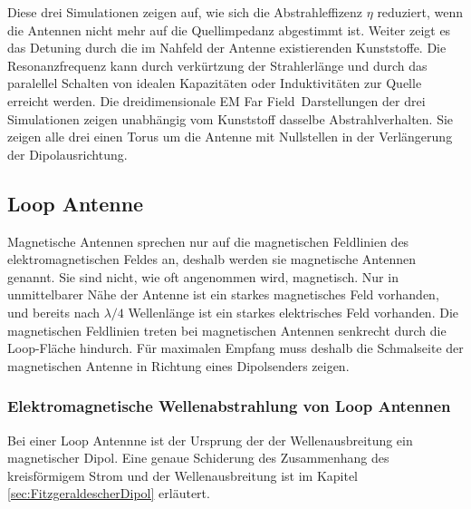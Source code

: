 Diese drei Simulationen zeigen auf, wie sich die Abstrahleffizenz $\eta$ reduziert, wenn die Antennen nicht mehr auf die Quellimpedanz abgestimmt ist. Weiter zeigt es das Detuning durch die im Nahfeld der Antenne existierenden Kunststoffe. Die Resonanzfrequenz kann durch verkürtzung der Strahlerlänge und durch das paralellel Schalten von idealen Kapazitäten oder Induktivitäten zur Quelle erreicht werden.
Die dreidimensionale \glqq EM Far Field\grqq \  Darstellungen der drei Simulationen zeigen unabhängig vom Kunststoff dasselbe Abstrahlverhalten. Sie zeigen alle drei einen Torus um die Antenne mit Nullstellen in der Verlängerung der Dipolausrichtung.







\subsection{Loop Antenne}
Magnetische Antennen sprechen nur auf die magnetischen Feldlinien des elektromagnetischen Feldes an, deshalb werden sie magnetische Antennen genannt. Sie sind nicht, wie oft angenommen wird, magnetisch. Nur in unmittelbarer Nähe der Antenne ist ein starkes magnetisches Feld vorhanden, und bereits nach $\lambda/4$ Wellenlänge ist ein starkes elektrisches Feld vorhanden. Die magnetischen Feldlinien treten bei magnetischen Antennen senkrecht durch die Loop-Fläche hindurch. Für maximalen Empfang muss deshalb die Schmalseite der magnetischen Antenne in Richtung eines Dipolsenders  zeigen.

\subsubsection*{Elektromagnetische Wellenabstrahlung von Loop Antennen}
Bei einer Loop Antennne ist der Ursprung der der Wellenausbreitung ein magnetischer Dipol. Eine genaue Schiderung des Zusammenhang des kreisförmigem Strom und der Wellenausbreitung ist im Kapitel \ref{sec:FitzgeraldescherDipol} erläutert. 

